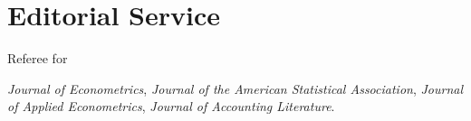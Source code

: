 \documentclass[10pt,letterpaper]{article}
\renewenvironment{itemize}{
  \begin{list}{}{
      \setlength{\leftmargin}{1.5em}
      \setlength{\itemsep}{0.25em}
      \setlength{\parskip}{0pt}
      \setlength{\parsep}{0.25em}
    }
}{
  \end{list}
}
\begin{document}
\section*{Editorial Service}
\begin{itemize}
\item Referee for 
\begin{itemize}
  \item
  \textit{Journal of Econometrics}, 
  \textit{Journal of the American Statistical Association}, 
  \textit{Journal of Applied Econometrics}, 
  \textit{Journal of Accounting Literature}.
\end{itemize}
\end{itemize}
%
\end{document}
